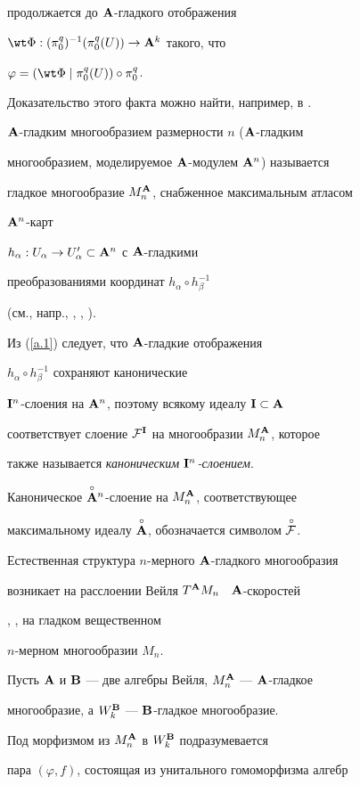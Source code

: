 продолжается до ${\bold A}$-гладкого отображения


$\wt\Phi:(\piqo)^{-1}(\piqo(U))\to\A^k$ такого, что


$\varphi=(\wt\Phi\mid \piqo(U))\circ\piqo$.


Доказательство этого факта можно найти, например, в \cite{VSh3}.


 


${\bold A}$-гладким многообразием размерности $n$ (${\bold A}$-гладким


многообразием, моделируемое ${\bold A}$-модулем ${\bold A}^n$) называется


гладкое многообразие $M^{\bold A}_n$, снабженное максимальным атласом


${\bold A}^n$-карт


$h_\alpha:U_\alpha\to U'_\alpha\subset{\bold A}^n$ с ${\bold A}$-гладкими


преобразованиями координат $h_\alpha\circ h_\beta^{-1}$


(см., напр., \cite{Van}, \cite{VSh2}, \cite{VSh3}).


Из (\ref{a.1}) следует, что ${\bold A}$-гладкие отображения


$h_\alpha\circ h_\beta^{-1}$ сохраняют канонические


${\bold I}^n$-слоения на ${\bold A}^n$, поэтому всякому идеалу ${\bold I}\subset{\bold A}$


соответствует слоение ${\cal F}^{\bold I}$ на многообразии $M^{\bold A}_n$, которое


также называется {\it каноническим ${\bold I}^n$-слоением}.


Каноническое $\overset{\circ}{{\bold A}}{}^n$-слоение на $M_n^{\bold A}$, соответствующее


максимальному идеалу $\overset{\circ}{\bold A}{}$, обозначается символом $\overset{\,\circ}{\cal F}{}$.


Естественная структура $n$-мерного ${\bold A}$-гладкого многообразия


возникает на расслоении Вейля $T^{\bold A} M_n$ \ ${\bold A}$-скоростей


\cite{KMS}, \cite{VSh3}, \cite{VSh4} на гладком вещественном


$n$-мерном многообразии $M_n$.


Пусть ${\bold A}$ и ${\bold B}$ --- две алгебры Вейля, $M^{\bold A}_n$ --- ${\bold A}$-гладкое


многообразие, а $W^{\bold B}_k$ --- ${\bold B}$-гладкое многообразие.


Под морфизмом из $M^{\bold A}_n$ в $W^{\bold B}_k$ подразумевается


пара $(\varphi, f)$, состоящая из унитального гомоморфизма алгебр


